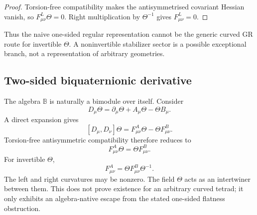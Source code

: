 \documentclass[12pt,a4paper]{article}
\theoremstyle{remark}\newtheorem{remark}[definition]{Remark}
\begin{document}
\begin{proof}
Torsion-free compatibility makes the antisymmetrised covariant Hessian vanish,
so $F^L_{\mu\nu}\Theta=0$.  Right multiplication by $\Theta^{-1}$ gives
$F^L_{\mu\nu}=0$.
\end{proof}

Thus the naive one-sided regular representation cannot be the generic curved
GR route for invertible $\Theta$.  A noninvertible stabilizer sector is a
possible exceptional branch, not a representation of arbitrary geometries.

\subsection{Two-sided biquaternionic derivative}
The algebra $\mathbb B$ is naturally a bimodule over itself.  Consider
\begin{equation}
 \boxed{
 D_\mu\Theta=\partial_\mu\Theta+A_\mu\Theta-\Theta B_\mu.}
 \label{eq:two-sided-paper}
\end{equation}
A direct expansion gives
\begin{equation}
 \boxed{
 [D_\mu,D_\nu]\Theta
 =F^A_{\mu\nu}\Theta-\Theta F^B_{\mu\nu}.}
 \label{eq:two-sided-curvature-paper}
\end{equation}
Torsion-free antisymmetric compatibility therefore reduces to
\begin{equation}
 F^A_{\mu\nu}\Theta=\Theta F^B_{\mu\nu}.
 \label{eq:intertwiner-paper}
\end{equation}
For invertible $\Theta$,
\begin{equation}
 \boxed{F^A_{\mu\nu}=\Theta F^B_{\mu\nu}\Theta^{-1}.}
\end{equation}
The left and right curvatures may be nonzero.  The field $\Theta$ acts as an
intertwiner between them.  This does not prove existence for an arbitrary
curved tetrad; it only exhibits an algebra-native escape from the stated
one-sided flatness obstruction.
\end{document}
